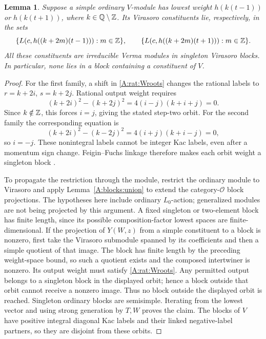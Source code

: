 \documentclass[11pt]{article}
\newtheorem{lemma}[theorem]{Lemma}
\numberwithin{equation}{section}
\begin{document}
\begin{lemma}\label{A:rat:genericorbit}
Suppose a simple ordinary $V$-module has lowest weight $h(k(t-1))$ or $h(k(t+1))$, where $k\in\mathbb Q\setminus\mathbb Z$. Its Virasoro constituents lie, respectively, in the sets
\[
 \{L(c,h((k+2m)(t-1))):m\in\mathbb Z\},\qquad
 \{L(c,h((k+2m)(t+1))):m\in\mathbb Z\}.
\]
All these constituents are irreducible Verma modules in singleton Virasoro blocks. In particular, none lies in a block containing a constituent of $V$.
\end{lemma}
\begin{proof}
For the first family, a shift in \eqref{A:rat:Wroots} changes the rational labels to $r=k+2i$, $s=k+2j$. Rational output weight requires
\[
 (k+2i)^2-(k+2j)^2=4(i-j)(k+i+j)=0.
\]
Since $k\notin\mathbb Z$, this forces $i=j$, giving the stated step-two orbit. For the second family the corresponding equation is
\[
 (k+2i)^2-(k-2j)^2=4(i+j)(k+i-j)=0,
\]
so $i=-j$. These nonintegral labels cannot be integer Kac labels, even after a momentum sign change. Feigin--Fuchs linkage therefore makes each orbit weight a singleton block \cite[Theorem 3.1]{A:BNW}.

To propagate the restriction through the module, restrict the ordinary module to Virasoro and apply Lemma~\ref{A:blocks:union} to extend the category-$\mathcal O$ block projections. The hypotheses here include ordinary $L_0$-action; generalized modules are not being projected by this argument. A fixed singleton or two-element block has finite length, since its possible composition-factor lowest spaces are finite-dimensional. If the projection of $Y(W,z)$ from a simple constituent to a block is nonzero, first take the Virasoro submodule spanned by its coefficients and then a simple quotient of that image. The block has finite length by the preceding weight-space bound, so such a quotient exists and the composed intertwiner is nonzero. Its output weight must satisfy \eqref{A:rat:Wroots}. Any permitted output belongs to a singleton block in the displayed orbit; hence a block outside that orbit cannot receive a nonzero image. Thus no block outside the displayed orbit is reached. Singleton ordinary blocks are semisimple. Iterating from the lowest vector and using strong generation by $T,W$ proves the claim. The blocks of $V$ have positive integral diagonal Kac labels and their linked negative-label partners, so they are disjoint from these orbits.
\end{proof}
\end{document}
